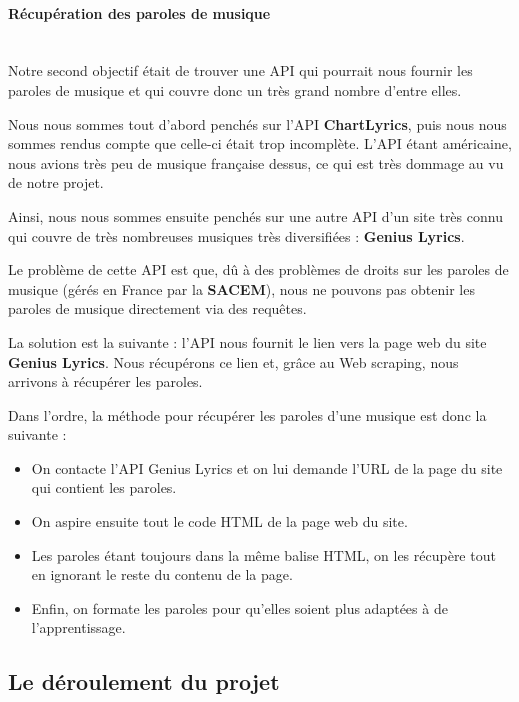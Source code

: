 \documentclass[12pt,french]{article}
\begin{document}
\paragraph{Récupération des paroles de musique \\\\}

Notre second objectif était de trouver une API qui pourrait nous fournir les paroles de musique et qui couvre donc un très grand nombre d'entre elles.

\medskip

Nous nous sommes tout d'abord penchés sur l'API \textbf{ChartLyrics}, puis nous nous sommes rendus compte que celle-ci était trop incomplète. L'API étant américaine, nous avions très peu de musique française dessus, ce qui est très dommage au vu de notre projet.

\medskip

Ainsi, nous nous sommes ensuite penchés sur une autre API d'un site très connu qui couvre de très nombreuses musiques très diversifiées : \textbf{Genius Lyrics}.

Le problème de cette API est que, dû à des problèmes de droits sur les paroles de musique (gérés en France par la \textbf{SACEM}), nous ne pouvons pas obtenir les paroles de musique directement via des requêtes.

La solution est la suivante : l'API nous fournit le lien vers la page web du site \textbf{Genius Lyrics}. Nous récupérons ce lien et, grâce au Web scraping, nous arrivons à récupérer les paroles.

Dans l'ordre, la méthode pour récupérer les paroles d'une musique est donc la suivante :

\medskip

\begin{itemize}
	\item On contacte l'API Genius Lyrics et on lui demande l'URL de la page du site qui contient les paroles.
	\item On aspire ensuite tout le code HTML de la page web du site.
	\item Les paroles étant toujours dans la même balise HTML, on les récupère tout en ignorant le reste du contenu de la page.
	\item Enfin, on formate les paroles pour qu'elles soient plus adaptées à de l'apprentissage.
\end{itemize}

\medskip

\subsection{Le déroulement du projet}
\end{document}
